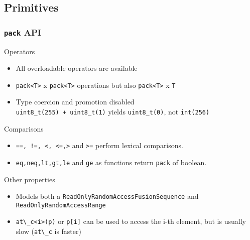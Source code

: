 \subsection{Primitives}

\frame
{
  \frametitle{\texttt{pack} API}
	
  \begin{block}{Operators}
	\begin{itemize}
   \footnotesize
		\item All overloadable operators are available
		\item \lstinline{pack<T>} x \lstinline{pack<T>} operations but also \lstinline{pack<T>} x \lstinline{T}
		\item Type coercion and promotion disabled\\
		      \lstinline{uint8_t(255) + uint8_t(1)} yields \lstinline{uint8_t(0)}, not \lstinline{int(256)}
	\end{itemize}	
	\end{block}{}

	\begin{block}{Comparisons}
	 \begin{itemize}
\footnotesize
	\item \texttt{==, !=, <, <=,>} and \texttt{>=} perform lexical comparisons.
	\item \texttt{eq,neq,lt,gt,le} and \texttt{ge} as functions return \texttt{pack} of boolean.
\end{itemize}
\end{block}{}
\begin{block}{Other properties}
	\begin{itemize}
   \footnotesize
		\item Models both a \texttt{ReadOnlyRandomAccessFusionSequence} and \texttt{ReadOnlyRandomAccessRange}
		\item \lstinline{at\_c<i>(p)} or \lstinline{p[i]} can be used to access the i-th element, but is usually slow (\lstinline{at\_c} is faster)
	\end{itemize}
	\end{block}{}
}


